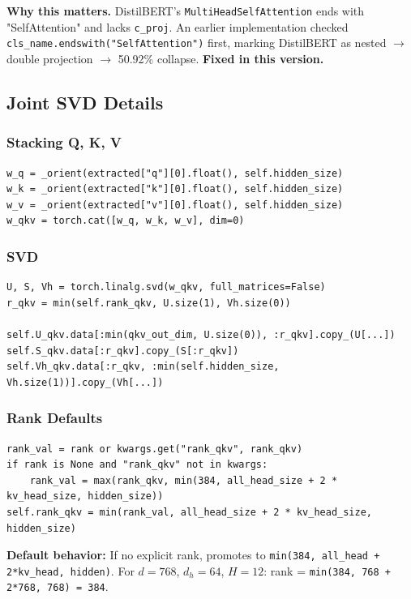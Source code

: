 \textbf{Why this matters.} DistilBERT's \texttt{MultiHeadSelfAttention} ends with 
"SelfAttention" and lacks \texttt{c\_proj}. An earlier implementation checked 
\texttt{cls\_name.endswith("SelfAttention")} first, marking DistilBERT as nested $\to$ 
double projection $\to$ 50.92\% collapse. \textbf{Fixed in this version.}

\subsection{Joint SVD Details}

\subsubsection{Stacking Q, K, V}

\begin{lstlisting}
w_q = _orient(extracted["q"][0].float(), self.hidden_size)
w_k = _orient(extracted["k"][0].float(), self.hidden_size)
w_v = _orient(extracted["v"][0].float(), self.hidden_size)
w_qkv = torch.cat([w_q, w_k, w_v], dim=0)
\end{lstlisting}

\subsubsection{SVD}

\begin{lstlisting}
U, S, Vh = torch.linalg.svd(w_qkv, full_matrices=False)
r_qkv = min(self.rank_qkv, U.size(1), Vh.size(0))

self.U_qkv.data[:min(qkv_out_dim, U.size(0)), :r_qkv].copy_(U[...])
self.S_qkv.data[:r_qkv].copy_(S[:r_qkv])
self.Vh_qkv.data[:r_qkv, :min(self.hidden_size, Vh.size(1))].copy_(Vh[...])
\end{lstlisting}

\subsubsection{Rank Defaults}

\begin{lstlisting}
rank_val = rank or kwargs.get("rank_qkv", rank_qkv)
if rank is None and "rank_qkv" not in kwargs:
    rank_val = max(rank_qkv, min(384, all_head_size + 2 * kv_head_size, hidden_size))
self.rank_qkv = min(rank_val, all_head_size + 2 * kv_head_size, hidden_size)
\end{lstlisting}

\textbf{Default behavior:} If no explicit rank, promotes to \texttt{min(384, all\_head + 2*kv\_head, hidden)}. 
For $d = 768$, $d_h = 64$, $H = 12$: rank = \texttt{min(384, 768 + 2*768, 768) = 384}.

